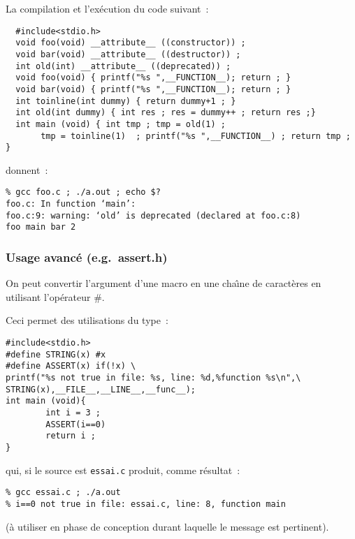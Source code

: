 \begin{frame}[fragile]
	La compilation et l'ex\'ecution du code suivant~:
  \begin{verbatim}
  #include<stdio.h>
  void foo(void) __attribute__ ((constructor)) ;
  void bar(void) __attribute__ ((destructor)) ;
  int old(int) __attribute__ ((deprecated)) ;
  void foo(void) { printf("%s ",__FUNCTION__); return ; }
  void bar(void) { printf("%s ",__FUNCTION__); return ; }
  int toinline(int dummy) { return dummy+1 ; }   
  int old(int dummy) { int res ; res = dummy++ ; return res ;}
  int main (void) { int tmp ; tmp = old(1) ; 
       tmp = toinline(1)  ; printf("%s ",__FUNCTION__) ; return tmp ; }
  \end{verbatim}
donnent~:
\begin{verbatim}
% gcc foo.c ; ./a.out ; echo $? 
foo.c: In function ‘main’:
foo.c:9: warning: ‘old’ is deprecated (declared at foo.c:8)
foo main bar 2
\end{verbatim}
\end{frame}
\begin{frame}[fragile]
  \frametitle{Usage avanc\'e (e.g.\ assert.h)}
  On peut convertir l'argument d'une macro en une cha\^\i{}ne de
  caract\`eres en utilisant l'op\'erateur \#.
  \par\smallskip
  Ceci permet des utilisations du type~:
\begin{verbatim}
#include<stdio.h>
#define STRING(x) #x
#define ASSERT(x) if(!x) \
printf("%s not true in file: %s, line: %d,%function %s\n",\
STRING(x),__FILE__,__LINE__,__func__);
int main (void){
        int i = 3 ;
        ASSERT(i==0) 
        return i ;
}
\end{verbatim}
qui, si le source est \verb+essai.c+ produit, comme r\'esultat~:
\begin{verbatim}
% gcc essai.c ; ./a.out 
% i==0 not true in file: essai.c, line: 8, function main
\end{verbatim}
(\`a utiliser en phase de conception durant laquelle le message est pertinent).
\end{frame}
